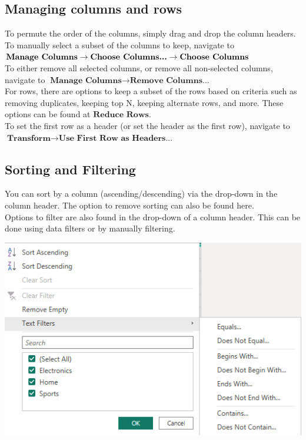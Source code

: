 \documentclass[10pt, openany, twocolumn]{book}
\begin{document}
\subsection*{Managing columns and rows}

To permute the order of the columns, simply drag and drop the column headers.\\

To manually select a subset of the columns to keep, navigate to $\textbf{Manage Columns} \rightarrow \\\textbf{Choose Columns...} \rightarrow \textbf{Choose Columns}$\\

To either remove all selected columns, or remove all non-selected columns, navigate to $\textbf{Manage Columns} \rightarrow \textbf{Remove Columns...}$\\

For rows, there are options to keep a subset of the rows based on criteria such as removing duplicates, keeping top N, keeping alternate rows, and more. These options can be found at $\textbf{Reduce Rows}$.\\

To set the first row as a header (or set the header as the first row), navigate to \\
$\textbf{Transform} \rightarrow \textbf{Use First Row as Headers...}$

\subsection*{Sorting and Filtering}

You can sort by a column (ascending/descending) via the drop-down in the column header. The option to remove sorting can also be found here.\\

Options to filter are also found in the drop-down of a column header. This can be done using data filters or by manually filtering.

\begin{center}
    \includegraphics[width = 0.8\columnwidth]{images/header_drop_down.png}
\end{center}
\end{document}
